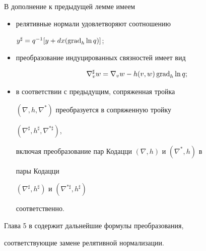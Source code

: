 В дополнение к предыдущей лемме имеем


\begin{itemize}


\item[(i)] релятивные нормали удовлетворяют соотношению


$y^{\sharp} = q^{-1}[y + dx(\operatorname{grad}_h \ln q)]$;


\item[(ii)] преобразование индуцированных связностей имеет вид


$$


\nabla^{\sharp}_v w = \nabla_v w - h(v,w) \grad_h \ln q;


$$


\item[(iii)] в соответствии с предыдущим, сопряженная тройка


$(\nabla,h, \nabla^{*})$ преобразуется в сопряженную тройку


$(\nabla^{\sharp}, h^{\sharp},\nabla^{* \sharp})$,


включая преобразование пар Кодацци $(\nabla,h)$ и $(\nabla^*,h)$ в


пары Кодацци


$(\nabla^{\sharp},h^{\sharp})$ и $(\nabla^{* \sharp},h^{\sharp})$


соответственно.


\end{itemize}








Глава 5 в \cite{SIM-S-V} содержит дальнейшие формулы преобразования,


соответствующие замене релятивной нормализации.

















\vskip 1cm












\label{end}











